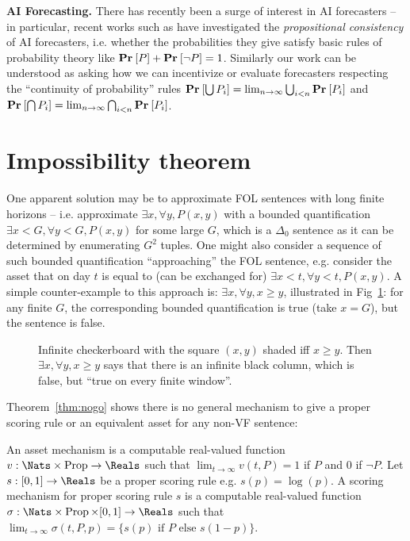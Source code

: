 \textbf{AI Forecasting.} There has recently been a surge of interest in AI forecasters \cite{zouForecastingFutureWorld2022, schoeneggerLargeLanguageModel2023,yanAutoCastEnhancingWorld2023, halawiApproachingHumanLevelForecasting2024a, schoeneggerWisdomSiliconCrowd2024} -- in particular, recent works such as \cite{sudhirConsistencyChecksLanguage2024} have investigated the \emph{propositional consistency} of AI forecasters, i.e. whether the probabilities they give satisfy basic rules of probability theory like $\VFPAPERProb{P}+\VFPAPERProb{\lnot P}=1$. Similarly our work can be understood as asking how we can incentivize or evaluate forecasters respecting the ``continuity of probability'' rules $\VFPAPERProb{\bigcup P_i}=\lim_{n\to\infty}\bigcup_{i<n}\VFPAPERProb{P_i}$ and $\VFPAPERProb{\bigcap P_i}=\lim_{n\to\infty}\bigcap_{i<n}\VFPAPERProb{P_i}$.

\section{Impossibility theorem}
\label{vf/sec:impossible}

One apparent solution may be to approximate FOL sentences with long finite horizons -- i.e. approximate $\exists x,\forall y, P(x,y)$ with a bounded quantification $\exists x<G,\forall y<G, P(x,y)$ for some large $G$, which is a $\Delta_0$ sentence as it can be determined by enumerating $G^2$ tuples. One might also consider a sequence of such bounded quantification ``approaching'' the FOL sentence, e.g. consider the asset that on day $t$ is equal to (can be exchanged for) $\exists x< t,\forall y< t, P(x,y)$. A simple counter-example to this approach is: $\exists x,\forall y,x\ge y$, illustrated in Fig~\ref{fig:checkerboard}: for any finite $G$, the corresponding bounded quantification is true (take $x=G$), but the sentence is false.

\begin{figure}
  \centering
  
  \caption{Infinite checkerboard with the square $(x,y)$ shaded iff $x\ge y$. Then $\exists x,\forall y, x\ge y$ says that there is an infinite black column, which is false, but ``true on every finite window''.}
  \label{fig:checkerboard}
\end{figure}

Theorem~\ref{thm:nogo} shows there is no general mechanism to give a proper scoring rule or an equivalent asset for any non-VF sentence:

\begin{definition}
  An asset mechanism is a computable real-valued function $v:\Nats\times\Props\to\Reals$ such that $\lim_{t\to\infty}v(t,P)=1$ if $P$ and $0$ if $\lnot P$. Let $s:[0,1]\to\Reals$ be a proper scoring rule e.g. $s(p)=\log(p)$. A scoring mechanism for proper scoring rule $s$ is a computable real-valued function $\sigma:\Nats\times\Props\times[0,1]\to\Reals$ such that $\lim_{t\to\infty}\sigma(t,P,p)=\{s(p)\text{ if }P\text{ else }s(1-p)\}$.
  \label{def:mechanisms}
\end{definition}

